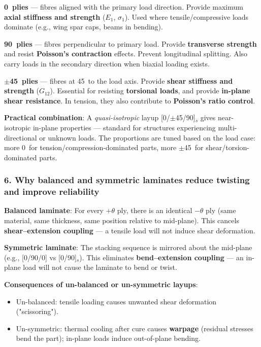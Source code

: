 \documentclass{NoteThesis/note-thesis}
\begin{document}
\textbf{0\textdegree\ plies} — fibres aligned with the primary load direction. Provide maximum \textbf{axial stiffness and strength} ($E_1$, $\sigma_1$). Used where tensile/compressive loads dominate (e.g., wing spar caps, beams in bending).

\textbf{90\textdegree\ plies} — fibres perpendicular to primary load. Provide \textbf{transverse strength} and resist \textbf{Poisson's contraction} effects. Prevent longitudinal splitting. Also carry loads in the secondary direction when biaxial loading exists.

\textbf{$\pm$45\textdegree\ plies} — fibres at 45\textdegree\ to the load axis. Provide \textbf{shear stiffness and strength} ($G_{12}$). Essential for resisting \textbf{torsional loads}, and provide \textbf{in-plane shear resistance}. In tension, they also contribute to \textbf{Poisson's ratio control}.

\textbf{Practical combination}: A \textit{quasi-isotropic} layup [0/$\pm$45/90]$_s$ gives near-isotropic in-plane properties — standard for structures experiencing multi-directional or unknown loads. The proportions are tuned based on the load case: more 0\textdegree\ for tension/compression-dominated parts, more $\pm$45\textdegree\ for shear/torsion-dominated parts.

\subsubsection*{6. Why balanced and symmetric laminates reduce twisting and improve reliability}

\textbf{Balanced laminate}: For every $+\theta$ ply, there is an identical $-\theta$ ply (same material, same thickness, same position relative to mid-plane). This cancels \textbf{shear--extension coupling} — a tensile load will not induce shear deformation.

\textbf{Symmetric laminate}: The stacking sequence is mirrored about the mid-plane (e.g., [0/90/0] vs [0/90]$_s$). This eliminates \textbf{bend--extension coupling} — an in-plane load will not cause the laminate to bend or twist.

\textbf{Consequences of un-balanced or un-symmetric layups}:
\begin{itemize}
    \item Un-balanced: tensile loading causes unwanted shear deformation ("scissoring").
    \item Un-symmetric: thermal cooling after cure causes \textbf{warpage} (residual stresses bend the part); in-plane loads induce out-of-plane bending.
\end{itemize}
\end{document}
